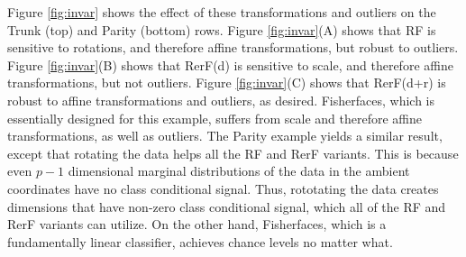 \documentclass{article} %
\begin{document}
Figure \ref{fig:invar} shows the effect of these transformations and outliers on the Trunk (top) and Parity (bottom) rows. Figure \ref{fig:invar}(A) shows that RF is sensitive to rotations, and therefore affine transformations, but robust to outliers.  Figure \ref{fig:invar}(B) shows that RerF(d) is sensitive to scale, and therefore affine transformations, but not outliers.   Figure \ref{fig:invar}(C) shows that RerF(d+r) is robust to affine transformations and outliers, as desired.  Fisherfaces, which is essentially designed for this example, suffers from scale and therefore affine transformations, as well as outliers.  The Parity example yields a similar result, except that rotating the data helps all the RF and RerF variants.  This is because even $p-1$ dimensional marginal distributions of the data in the ambient coordinates have no class conditional signal.  Thus, rototating the data creates dimensions that have non-zero class conditional signal, which all of the RF and RerF variants can utilize.  On the other hand, Fisherfaces, which is a fundamentally linear classifier, achieves chance levels no matter what.  

\end{document}
